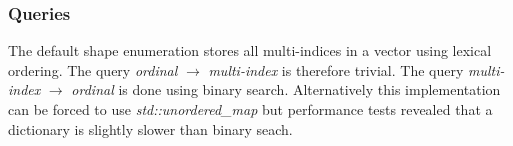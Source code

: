 \documentclass{article}
\begin{document}
\subsubsection{Queries}
The default shape enumeration stores all multi-indices in a vector using lexical ordering. The query \emph{ordinal} \(\rightarrow\) \emph{multi-index} is therefore trivial. The query \emph{multi-index} \(\rightarrow\) \emph{ordinal} is done using binary search. Alternatively this implementation can be forced to use \emph{std::unordered\_map} but performance tests revealed that a dictionary is slightly slower than binary seach.
\end{document}
